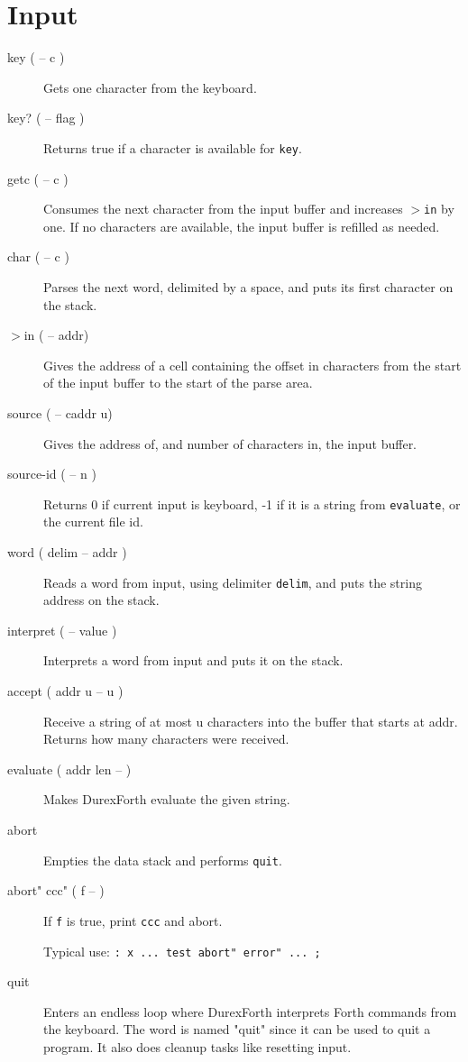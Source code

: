 \section{Input}

\begin{description}

\item[key ( -- c )] Gets one character from the keyboard.
\item[key? ( -- flag )] Returns true if a character is available for \texttt{key}.
\item[getc ( -- c )] Consumes the next character from the input buffer and increases \texttt{$>$in} by one. If no characters are available, the input buffer is refilled as needed.

\item[char ( -- c )] Parses the next word, delimited by a space, and puts its first character on the stack.

\item[$>$in ( -- addr)] Gives the address of a cell containing the offset in characters from the start of the input buffer to the start of the parse area.

\item[source ( -- caddr u)] Gives the address of, and number of characters in, the input buffer.
\item[source-id ( -- n )] Returns 0 if current input is keyboard, -1 if it is a string from \texttt{evaluate}, or the current file id.

\item[word ( delim -- addr )] Reads a word from input, using delimiter \texttt{delim}, and puts the string address on the stack.

\item[interpret ( -- value )] Interprets a word from input and puts it on the stack.

\item[accept ( addr u -- u )] Receive a string of at most u characters into the buffer that starts at addr. Returns how many characters were received.

\item[evaluate ( addr len -- )] Makes DurexForth evaluate the given string.

\item[abort] Empties the data stack and performs \texttt{quit}.

\item[abort" ccc" ( f -- ) ] If \texttt{f} is true, print \texttt{ccc} and abort.

    Typical use: \texttt{: x ... test abort" error" ... ;}

\item[quit] Enters an endless loop where DurexForth interprets Forth commands from the keyboard. The word is named "quit" since it can be used to quit a program. It also does cleanup tasks like resetting input.

\end{description}

